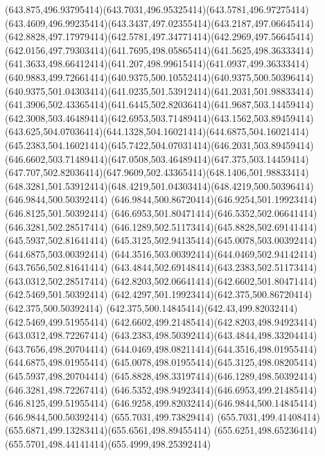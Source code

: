 {{	\curveto(643.875,496.93795414)(643.7031,496.95325414)(643.5781,496.97275414)
	\curveto(643.4609,496.99235414)(643.3437,497.02355414)(643.2187,497.06645414)
	\curveto(642.8828,497.17979414)(642.5781,497.34771414)(642.2969,497.56645414)
	\curveto(642.0156,497.79303414)(641.7695,498.05865414)(641.5625,498.36333414)
	\curveto(641.3633,498.66412414)(641.207,498.99615414)(641.0937,499.36333414)
	\curveto(640.9883,499.72661414)(640.9375,500.10552414)(640.9375,500.50396414)
	\curveto(640.9375,501.04303414)(641.0235,501.53912414)(641.2031,501.98833414)
	\curveto(641.3906,502.43365414)(641.6445,502.82036414)(641.9687,503.14459414)
	\curveto(642.3008,503.46489414)(642.6953,503.71489414)(643.1562,503.89459414)
	\curveto(643.625,504.07036414)(644.1328,504.16021414)(644.6875,504.16021414)
	\curveto(645.2383,504.16021414)(645.7422,504.07031414)(646.2031,503.89459414)
	\curveto(646.6602,503.71489414)(647.0508,503.46489414)(647.375,503.14459414)
	\curveto(647.707,502.82036414)(647.9609,502.43365414)(648.1406,501.98833414)
	\curveto(648.3281,501.53912414)(648.4219,501.04303414)(648.4219,500.50396414)
	\closepath
	\moveto(646.9844,500.50392414)
	\curveto(646.9844,500.86720414)(646.9254,501.19923414)(646.8125,501.50392414)
	\curveto(646.6953,501.80471414)(646.5352,502.06641414)(646.3281,502.28517414)
	\curveto(646.1289,502.51173414)(645.8828,502.69141414)(645.5937,502.81641414)
	\curveto(645.3125,502.94135414)(645.0078,503.00392414)(644.6875,503.00392414)
	\curveto(644.3516,503.00392414)(644.0469,502.94142414)(643.7656,502.81641414)
	\curveto(643.4844,502.69148414)(643.2383,502.51173414)(643.0312,502.28517414)
	\curveto(642.8203,502.06641414)(642.6602,501.80471414)(642.5469,501.50392414)
	\curveto(642.4297,501.19923414)(642.375,500.86720414)(642.375,500.50392414)
	\curveto(642.375,500.14845414)(642.43,499.82032414)(642.5469,499.51955414)
	\curveto(642.6602,499.21485414)(642.8203,498.94923414)(643.0312,498.72267414)
	\curveto(643.2383,498.50392414)(643.4844,498.33204414)(643.7656,498.20704414)
	\curveto(644.0469,498.08211414)(644.3516,498.01955414)(644.6875,498.01955414)
	\curveto(645.0078,498.01955414)(645.3125,498.08205414)(645.5937,498.20704414)
	\curveto(645.8828,498.33197414)(646.1289,498.50392414)(646.3281,498.72267414)
	\curveto(646.5352,498.94923414)(646.6953,499.21485414)(646.8125,499.51955414)
	\curveto(646.9258,499.82032414)(646.9844,500.14845414)(646.9844,500.50392414)
	\closepath
	\moveto(655.7031,499.73829414)
	\curveto(655.7031,499.41408414)(655.6871,499.13283414)(655.6561,498.89455414)
	\curveto(655.6251,498.65236414)(655.5701,498.44141414)(655.4999,498.25392414)
}}

